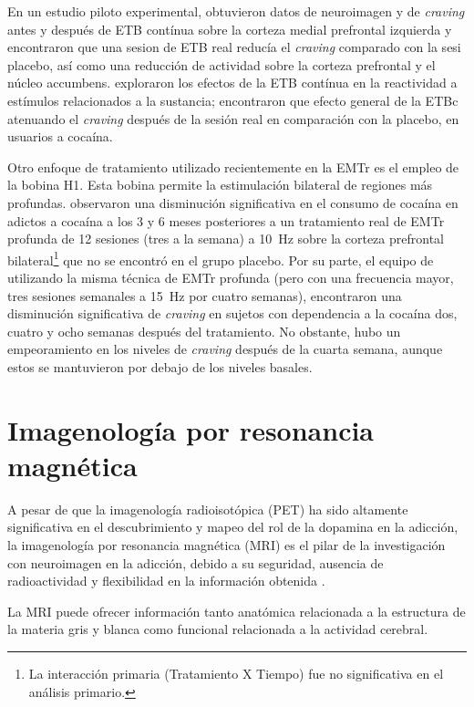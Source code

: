 En un estudio piloto experimental, \textcite{Hanlon2015} obtuvieron datos de neuroimagen y de \textit{craving} antes y después de ETB contínua sobre la corteza medial prefrontal izquierda y encontraron que una sesion de ETB real reducía el \textit{craving} comparado con la sesi placebo, así como una reducción de actividad sobre la corteza prefrontal y el núcleo accumbens.
\textcite{Kearney-Ramos2018a} exploraron los efectos de la ETB contínua en la reactividad a estímulos relacionados a la sustancia; encontraron que efecto general de la ETBc atenuando el \textit{craving} después de la sesión real en comparación con la placebo, en usuarios a cocaína. \par
Otro enfoque de tratamiento utilizado recientemente en la EMTr es el empleo de la bobina H1.
Esta bobina permite la estimulación bilateral de regiones más profundas.
\textcite{Bolloni2016} observaron una disminución significativa en el consumo de cocaína en adictos a cocaína a los 3 y 6 meses posteriores a un tratamiento real de EMTr profunda de 12 sesiones (tres a la semana) a \SI{10}{\hertz} sobre la corteza prefrontal bilateral\footnote{La interacción primaria (Tratamiento X Tiempo) fue no significativa en el análisis primario.} que no se encontró en el grupo placebo.
Por su parte, el equipo de \textcite{Rapinesi2016} utilizando la misma técnica de EMTr profunda (pero con una frecuencia mayor, tres sesiones semanales a \SI{15}{\hertz} por cuatro semanas), encontraron una disminución significativa de \textit{craving} en sujetos con dependencia a la cocaína dos, cuatro y ocho semanas después del tratamiento.
No obstante, hubo un empeoramiento en los niveles de \textit{craving} después de la cuarta semana, aunque estos se mantuvieron por debajo de los niveles basales.

\section{Imagenología por resonancia magnética}
A pesar de que la imagenología radioisotópica (PET) ha sido altamente significativa en el descubrimiento y mapeo del rol de la dopamina en la adicción, la imagenología por resonancia magnética (MRI) es el pilar de la investigación con neuroimagen en la adicción, debido a su seguridad, ausencia de radioactividad y flexibilidad en la información obtenida \parencite{Suckling2017}. \par
La MRI puede ofrecer información tanto anatómica \textemdash{}relacionada a la estructura de la materia gris y blanca\textemdash{} como funcional \textemdash{}relacionada a la actividad cerebral.

